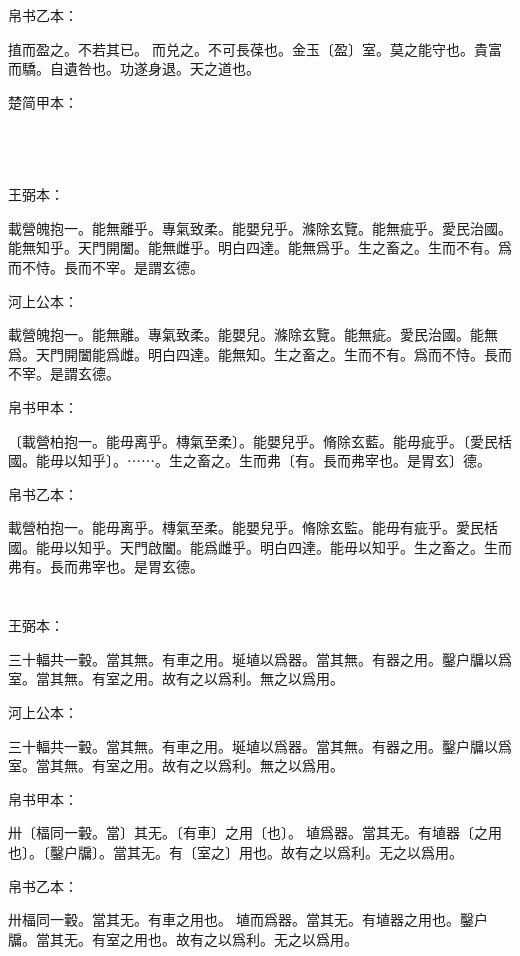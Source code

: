 \documentclass[a5paper]{ctexbook}
\begin{document}
    帛书乙本：

    㨁而盈之。不若其已。𢵦而兑之。不可長葆也。金玉〔盈〕室。莫之能守也。貴富而驕。自遺咎也。功遂身退。天之道也。

    楚简甲本：

    𣏔（持）而浧（盈）之。不不若已。湍而群之。不可長保也。金玉浧（盈）室。莫能獸（守）也。貴（富）喬（驕）。自遺咎也。攻（功）述（遂）身退。天之道也。

    \chapter{}
    王弼本：

    載營魄抱一。能無離乎。專氣致柔。能嬰兒乎。滌除玄覽。能無疵乎。愛民治國。能無知乎。天門開闔。能無雌乎。明白四達。能無爲乎。生之畜之。生而不有。爲而不恃。長而不宰。是謂玄德。

    河上公本：

    載營魄抱一。能無離。專氣致柔。能嬰兒。滌除玄覽。能無疵。愛民治國。能無爲。天門開闔能爲雌。明白四達。能無知。生之畜之。生而不有。爲而不恃。長而不宰。是謂玄德。

    帛书甲本：

    〔載營柏抱一。能毋离乎。槫氣至柔〕。能嬰兒乎。脩除玄藍。能毋疵乎。〔愛民栝國。能毋以知乎〕。⋯⋯。生之畜之。生而弗〔有。長而弗宰也。是胃玄〕德。

    帛书乙本：

    載營柏抱一。能毋离乎。槫氣至柔。能嬰兒乎。脩除玄監。能毋有疵乎。愛民栝國。能毋以知乎。天門啟闔。能爲雌乎。明白四達。能毋以知乎。生之畜之。生而弗有。長而弗宰也。是胃玄德。

    \chapter{}
    王弼本：

    三十輻共一轂。當其無。有車之用。埏埴以爲器。當其無。有器之用。鑿户牖以爲室。當其無。有室之用。故有之以爲利。無之以爲用。

    河上公本：

    三十輻共一轂。當其無。有車之用。埏埴以爲器。當其無。有器之用。鑿户牖以爲室。當其無。有室之用。故有之以爲利。無之以爲用。

    帛书甲本：

    卅〔楅同一轂。當〕其无。〔有車〕之用〔也〕。𡑋埴爲器。當其无。有埴器〔之用也〕。〔鑿户牖〕。當其无。有〔室之〕用也。故有之以爲利。无之以爲用。

    帛书乙本：

    卅楅同一轂。當其无。有車之用也。𡑋埴而爲器。當其无。有埴器之用也。鑿户牖。當其无。有室之用也。故有之以爲利。无之以爲用。
\end{document}
